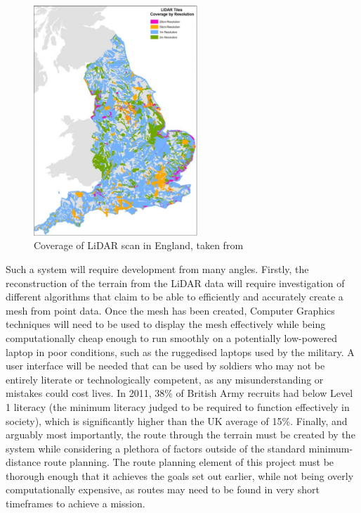 \documentclass[12pt,a4paper]{article}
\begin{document}
  \begin{figure}[h]
    \centering
    \includegraphics[width=0.55\textwidth]{lidar_coverage}
    \caption{Coverage of LiDAR scan in England, taken from \cite{env_technical_note}}
    \label{coverage_fig}
  \end{figure}

  \par Such a system will require development from many angles. Firstly, the reconstruction of the terrain from the LiDAR data will require investigation of different algorithms that claim to be able to efficiently and accurately create a mesh from point data. Once the mesh has been created, Computer Graphics techniques will need to be used to display the mesh effectively while being computationally cheap enough to run smoothly on a potentially low-powered laptop in poor conditions, such as the ruggedised laptops used by the military. A user interface will be needed that can be used by soldiers who may not be entirely literate or technologically competent, as any misunderstanding or mistakes could cost lives. In 2011, 38\% of British Army recruits had below Level 1 literacy (the minimum literacy judged to be required to function effectively in society), which is significantly higher than the UK average of 15\%. \cite{uk_literacy} Finally, and arguably most importantly, the route through the terrain must be created by the system while considering a plethora of factors outside of the standard minimum-distance route planning. The route planning element of this project must be thorough enough that it achieves the goals set out earlier, while not being overly computationally expensive, as routes may need to be found in very short timeframes to achieve a mission.
\end{document}
